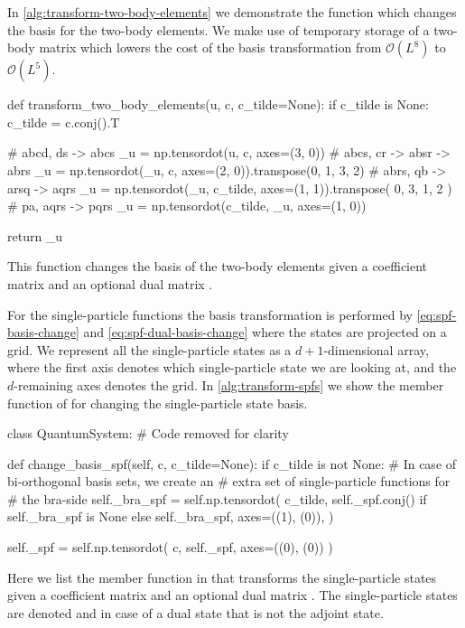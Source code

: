         In \autoref{alg:transform-two-body-elements} we demonstrate the function
        which changes the basis for the two-body elements.
        We make use of temporary storage of a two-body matrix  which
        lowers the cost of the basis transformation from $\mathcal{O}(L^8)$ to
        $\mathcal{O}(L^5)$.
        \begin{algorithm}
            \begin{python}
def transform_two_body_elements(u, c, c_tilde=None):
    if c_tilde is None:
        c_tilde = c.conj().T

    # abcd, ds -> abcs
    _u = np.tensordot(u, c, axes=(3, 0))
    # abcs, cr -> absr -> abrs
    _u = np.tensordot(_u, c, axes=(2, 0)).transpose(0, 1, 3, 2)
    # abrs, qb -> arsq -> aqrs
    _u = np.tensordot(_u, c_tilde, axes=(1, 1)).transpose(
        0, 3, 1, 2
    )
    # pa, aqrs -> pqrs
    _u = np.tensordot(c_tilde, _u, axes=(1, 0))

    return _u
            \end{python}
            \caption{This function changes the basis of the two-body elements
            given a coefficient matrix  and an optional dual matrix
            .}
            \label{alg:transform-two-body-elements}
        \end{algorithm}
        For the single-particle functions the basis transformation is performed
        by \autoref{eq:spf-basis-change} and \autoref{eq:spf-dual-basis-change}
        where the states are projected on a grid.
        We represent all the single-particle states as a $d + 1$-dimensional
        array, where the first axis denotes which single-particle state we are
        looking at, and the $d$-remaining axes denotes the grid.
        In \autoref{alg:transform-spfs} we show the member function of
         for changing the single-particle state basis.
        \begin{algorithm}
            \begin{python}
class QuantumSystem:
    # Code removed for clarity

    def change_basis_spf(self, c, c_tilde=None):
        if c_tilde is not None:
            # In case of bi-orthogonal basis sets, we create an
            # extra set of single-particle functions for
            # the bra-side
            self._bra_spf = self.np.tensordot(
                c_tilde,
                self._spf.conj()
                if self._bra_spf is None else self._bra_spf,
                axes=((1), (0)),
            )

        self._spf = self.np.tensordot(
            c, self._spf, axes=((0), (0))
        )
            \end{python}
            \caption{Here we list the member function in 
            that transforms the single-particle states given a coefficient
            matrix  and an optional dual matrix .
            The single-particle states are denoted  and
             in case of a dual state that is not the adjoint
            state.}
            \label{alg:transform-spfs}
        \end{algorithm}



